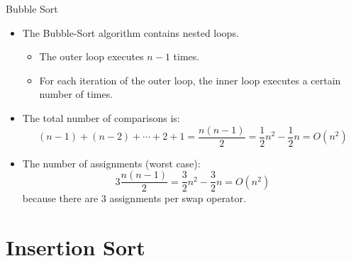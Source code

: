 \documentclass[14pt,aspectratio=1610]{beamer}
\begin{document}
\begin{frame}{Bubble Sort}
  \begin{itemize}
    \item
      The Bubble-Sort algorithm contains nested loops.
      \begin{itemize}
          \item
            The outer loop executes $n - 1$ times.
          \item
            For each iteration of the outer loop, the inner loop executes a certain number of times.
        \end{itemize}
    \item
      The total number of comparisons is:
      \begin{equation*}
        (n - 1) + (n - 2) + \cdots + 2 + 1 = \frac{n(n - 1)}{2} = \frac{1}{2}n^2 - \frac{1}{2}n = O(n^2)
      \end{equation*} 
    \item
      The number of assignments (worst case):
      \begin{equation*}
        3\frac{n(n - 1)}{2}= \frac{3}{2}n^2 - \frac{3}{2}n = O(n^2)
      \end{equation*}
      because there are 3 assignments per swap operator.
    \end{itemize}
\end{frame}

\section{Insertion Sort}
\end{document}
